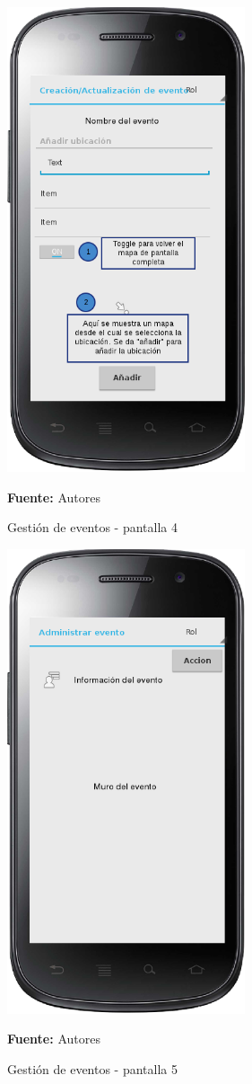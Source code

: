 \begin{figure}[!htb]
  \begin{center}
    \includegraphics[width=7cm]{./imagenes/UI/Eventos/gestion_eventos_4.png}
    \caption{Gestión de eventos - pantalla 4}
    \label{fig:gestion_eventos_4}
    \textbf{Fuente:}  Autores
  \end{center}
\end{figure}

\begin{figure}[!htb]
  \begin{center}
    \includegraphics[width=7cm]{./imagenes/UI/Eventos/gestion_eventos_5.png}
    \caption{Gestión de eventos - pantalla 5}
    \label{fig:gestion_eventos_5}
    \textbf{Fuente:}  Autores
  \end{center}
\end{figure}

